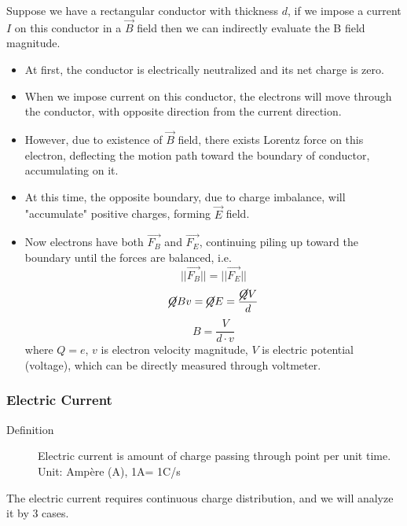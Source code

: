 \documentclass[12pt,a4paper,twoside]{article}
\begin{document}
    \noindent Suppose we have a rectangular conductor with thickness $d$, if we impose a current $I$ on this conductor in a $\overrightarrow{B}$ field then we can indirectly evaluate the B field magnitude.
    \begin{itemize}
        \item At first, the conductor is electrically neutralized and its net charge is zero.
        \item When we impose current on this conductor, the electrons will move through the conductor, with opposite direction from the current direction.
        \item However, due to existence of $\overrightarrow{B}$ field, there exists Lorentz force on this electron, deflecting the motion path toward the boundary of conductor, accumulating on it.
        \item At this time, the opposite boundary, due to charge imbalance, will "accumulate" positive charges, forming $\overrightarrow{E}$ field.
        \item Now electrons have both $\overrightarrow{F_B}$ and $\overrightarrow{F_E}$, continuing piling up toward the boundary until the forces are balanced, i.e.
        \[||\overrightarrow{F_B}||=||\overrightarrow{F_E}||\]
        \[\cancel{Q}Bv=\cancel{Q}E=\frac{\cancel{Q}V}{d}\]
        \[B=\frac{V}{d\cdot v}\]
        where $Q=e$, $v$ is electron velocity magnitude, $V$ is electric potential (voltage), which can be directly measured through voltmeter.
    \end{itemize}

\subsubsection{Electric Current}
    \begin{description}
        \item[Definition] Electric current is amount of charge passing through point per unit time. Unit: Amp\`ere (A), 1A= 1C/s
    \end{description}
    The electric current requires continuous charge distribution, and we will analyze it by 3 cases.
    
\end{document}
